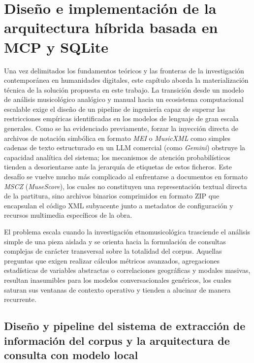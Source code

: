 \chapter{Diseño e implementación de la arquitectura híbrida basada en MCP y SQLite}
\label{cap:capitulo5}
\sloppy

Una vez delimitados los fundamentos teóricos y las fronteras de la investigación contemporánea en humanidades digitales, este capítulo aborda la materialización técnica de la solución propuesta en este trabajo. La transición desde un modelo de análisis musicológico analógico y manual hacia un ecosistema computacional escalable exige el diseño de un pipeline de ingeniería capaz de superar las restricciones empíricas identificadas en los modelos de lenguaje de gran escala generales. Como se ha evidenciado previamente, forzar la inyección directa de archivos de notación simbólica en formato \textit{MEI} o \textit{MusicXML} como simples cadenas de texto estructurado en un LLM comercial (como \textit{Gemini}) obstruye la capacidad analítica del sistema; los mecanismos de atención probabilísticos tienden a desorientarse ante la jerarquía de etiquetas de estos ficheros. Este desafío se vuelve mucho más complicado al enfrentarse a documentos en formato \textit{MSCZ} (\textit{MuseScore}), los cuales no constituyen una representación textual directa de la partitura, sino archivos binarios comprimidos en formato ZIP que encapsulan el código XML subyacente junto a metadatos de configuración y recursos multimedia específicos de la obra.

El problema escala cuando la investigación etnomusicológica trasciende el análisis simple de una pieza aislada y se orienta hacia la formulación de consultas complejas de carácter transversal sobre la totalidad del corpus. Aquellas preguntas que exigen realizar cálculos métricos avanzados, agregaciones estadísticas de variables abstractas o correlaciones geográficas y modales masivas, resultan inasumibles para los modelos conversacionales genéricos, los cuales saturan sus ventanas de contexto operativo y tienden a alucinar de manera recurrente.


\section{Diseño y pipeline del sistema de extracción de información del corpus y la arquitectura de consulta con modelo local}

